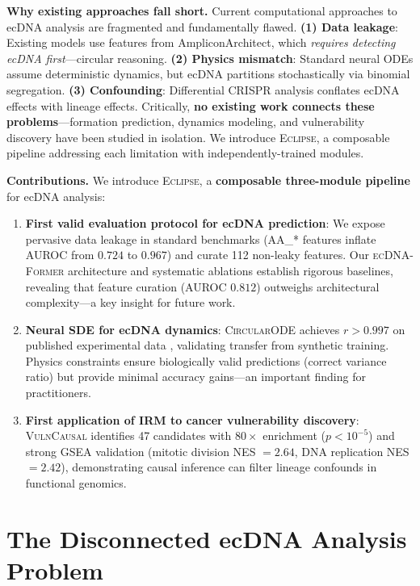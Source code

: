 \documentclass{article}
\newcommand{\eclipse}{\textsc{Eclipse}}
\newcommand{\former}{\textsc{ecDNA-Former}}
\newcommand{\circularode}{\textsc{CircularODE}}
\newcommand{\vulncausal}{\textsc{VulnCausal}}
\begin{document}
\textbf{Why existing approaches fall short.} Current computational approaches to ecDNA analysis are fragmented and fundamentally flawed. \textbf{(1) Data leakage}: Existing models use features from AmpliconArchitect, which \textit{requires detecting ecDNA first}---circular reasoning. \textbf{(2) Physics mismatch}: Standard neural ODEs assume deterministic dynamics, but ecDNA partitions stochastically via binomial segregation. \textbf{(3) Confounding}: Differential CRISPR analysis conflates ecDNA effects with lineage effects. Critically, \textbf{no existing work connects these problems}---formation prediction, dynamics modeling, and vulnerability discovery have been studied in isolation. We introduce \eclipse{}, a composable pipeline addressing each limitation with independently-trained modules.

\textbf{Contributions.} We introduce \eclipse{}, a \textbf{composable three-module pipeline} for ecDNA analysis:
\begin{enumerate}[nosep,topsep=2pt,leftmargin=*]
\item \textbf{First valid evaluation protocol for ecDNA prediction}: We expose pervasive data leakage in standard benchmarks (AA\_* features inflate AUROC from $0.724$ to $0.967$) and curate 112 non-leaky features. Our \former{} architecture and systematic ablations establish rigorous baselines, revealing that feature curation (AUROC $0.812$) outweighs architectural complexity---a key insight for future work.
\item \textbf{Neural SDE for ecDNA dynamics}: \circularode{} achieves $r > 0.997$ on published experimental data \citep{lange_2022_mathematical}, validating transfer from synthetic training. Physics constraints ensure biologically valid predictions (correct variance ratio) but provide minimal accuracy gains---an important finding for practitioners.
\item \textbf{First application of IRM to cancer vulnerability discovery}: \vulncausal{} identifies 47 candidates with $80\times$ enrichment ($p < 10^{-5}$) and strong GSEA validation (mitotic division NES $= 2.64$, DNA replication NES $= 2.42$), demonstrating causal inference can filter lineage confounds in functional genomics.
\end{enumerate}


\section{The Disconnected ecDNA Analysis Problem}
\label{sec:limitations}
\end{document}
